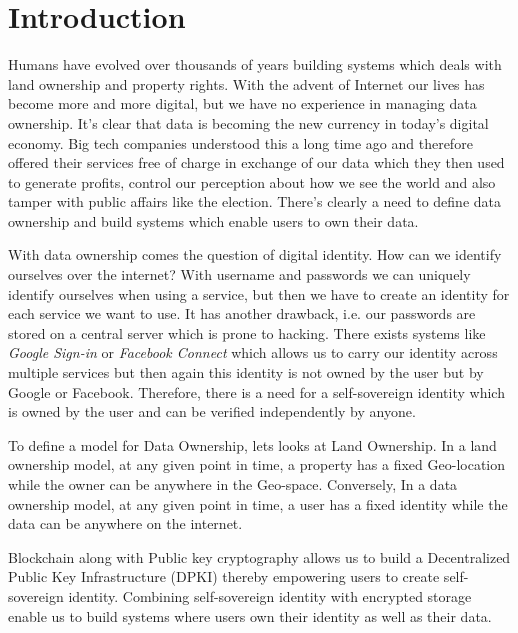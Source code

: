 \chapter{Introduction}\label{chapter::introduction}
Humans have evolved over thousands of years building systems which deals with land ownership and property rights. With the advent of Internet our lives has become more and more digital, but we have no experience in managing data ownership. It's clear that data is becoming the new currency in today's digital economy. Big tech companies understood this a long time ago and therefore offered their services free of charge in exchange of our data which they then used to generate profits, control our perception about how we see the world and also tamper with public affairs like the election. There's clearly a need to define data ownership and build systems which enable users to own their data.

With data ownership comes the question of digital identity. How can we identify ourselves over the internet? With username and passwords we can uniquely identify ourselves when using a service, but then we have to create an identity for each service we want to use. It has another drawback, i.e. our passwords are stored on a central server which is prone to hacking. There exists systems like \textit{Google Sign-in} or \textit{Facebook Connect} which allows us to carry our identity across multiple services but then again this identity is not owned by the user but by Google or Facebook. Therefore, there is a need for a self-sovereign identity which is owned by the user and can be verified independently by anyone.

To define a model for Data Ownership, lets looks at Land Ownership. In a land ownership model, at any given point in time, a property has a fixed Geo-location while the owner can be anywhere in the Geo-space. Conversely, In a data ownership model, at any given point in time, a user has a fixed identity while the data can be anywhere on the internet.

Blockchain along with Public key cryptography allows us to build a Decentralized Public Key Infrastructure (DPKI) thereby empowering users to create self-sovereign identity. Combining self-sovereign identity with encrypted storage enable us to build systems where users own their identity as well as their data.

